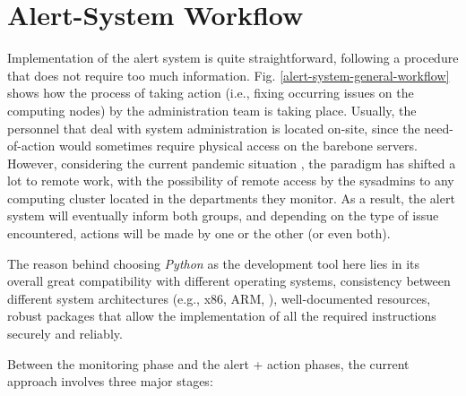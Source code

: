 \documentclass[conference]{IEEEtran}
\begin{document}
\section{Alert-System Workflow}
\label{section-alert-workflow}
Implementation of the alert system is quite straightforward, following a procedure that does not require too much information. Fig. \ref{alert-system-general-workflow} shows how the process of taking action (i.e., fixing occurring issues on the computing nodes) by the administration team is taking place. Usually, the personnel that deal with system administration is located on-site, since the need-of-action would sometimes require physical access on the barebone servers. However, considering the current pandemic situation \cite{ciotti2020covid}, the paradigm has shifted a lot to remote work, with the possibility of remote access by the sysadmins \cite{sallow2020client} to any computing cluster located in the departments they monitor. As a result, the alert system will eventually inform both groups, and depending on the type of issue encountered, actions will be made by one or the other (or even both).
\par The reason behind choosing \emph{Python} \cite{python3} as the development tool here lies in its overall great compatibility with different operating systems, consistency between different system architectures (e.g., x86, ARM, \cite{blem2013power}), well-documented resources, robust packages that allow the implementation of all the required instructions securely and reliably.
\par Between the monitoring phase and the alert + action phases, the current approach involves three major stages:
\end{document}
